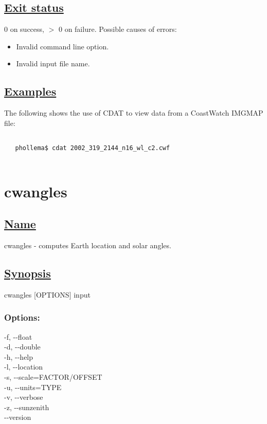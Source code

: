 \subsection*{\underline{Exit status}}


 0 on success, $>$ 0 on failure. Possible causes of errors:
\begin{itemize}
\item  Invalid command line option. 
\item  Invalid input file name. 

\end{itemize}
\subsection*{\underline{Examples}}


 The following shows the use of CDAT to view data from a CoastWatch IMGMAP file:
\begin{verbatim}

   phollema$ cdat 2002_319_2144_n16_wl_c2.cwf
 
\end{verbatim}

\newpage
\section{cwangles} \hypertarget{cwangles}{}
\subsection*{\underline{Name}}


   cwangles - computes Earth location and solar angles.  
\subsection*{\underline{Synopsis}}


 cwangles [OPTIONS] input
\subsubsection*{Options:}


  -f, -{-}float \\ 
 -d, -{-}double \\ 
 -h, -{-}help \\ 
 -l, -{-}location \\ 
 -s, -{-}scale=FACTOR/OFFSET \\ 
 -u, -{-}units=TYPE \\ 
 -v, -{-}verbose \\ 
 -z, -{-}sunzenith \\ 
 -{-}version \\ 

